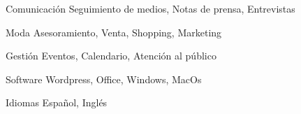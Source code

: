 

\begin{cvskills}

  \cvskill
    {Comunicación} %
    {Seguimiento de medios, Notas de prensa, Entrevistas} %

  \cvskill
    {Moda} %
    {Asesoramiento, Venta, Shopping, Marketing} %

  \cvskill
    {Gestión} %
    {Eventos, Calendario, Atención al público} %

  \cvskill
    {Software} %
    {Wordpress, Office, Windows, MacOs} %

  \cvskill
    {Idiomas} %
    {Español, Inglés} %

\end{cvskills}
